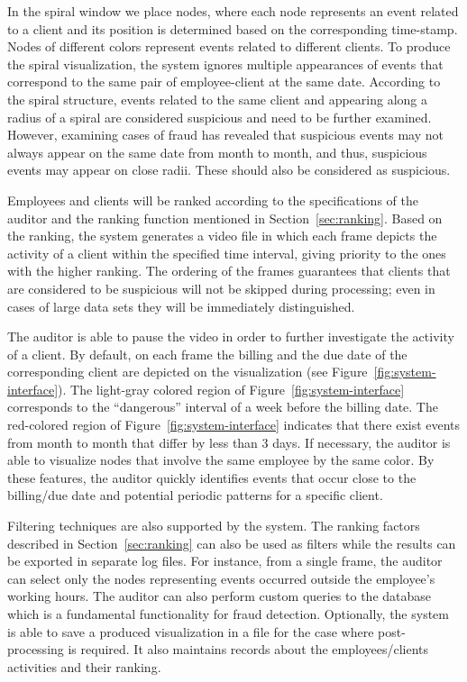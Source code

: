 \documentclass[conference]{IEEEtran}
\begin{document}
In the spiral window we place nodes, where each node represents an
event related to a client and its position is determined based on
the corresponding time-stamp. Nodes of different colors represent
events related to different clients. To produce the spiral
visualization, the system ignores multiple appearances of events
that correspond to the same pair of employee-client at the same
date. According to the spiral structure, events related to the same
client and appearing along a radius of a spiral are considered
suspicious and need to be further examined. However, examining cases
of fraud has revealed that suspicious events may not always appear
on the same date from month to month, and thus, suspicious events
may appear on close radii. These should also be considered as
suspicious.

Employees and clients will be ranked according to the specifications
of the auditor and the ranking function mentioned in
Section~\ref{sec:ranking}. Based on the ranking, the system
generates a video file in which each frame depicts the activity of a
client within the specified time interval, giving priority to the
ones with the higher ranking.  The ordering of the frames guarantees
that clients that are considered to be suspicious will not be
skipped during processing; even in cases of large data sets they
will be immediately distinguished.

The auditor is able to pause the video in order to further
investigate the activity of a client. By default, on each frame the
billing and the due date of the corresponding client are depicted on
the visualization (see Figure~\ref{fig:system-interface}). The
light-gray colored region of Figure~\ref{fig:system-interface}
corresponds to the ``dangerous'' interval of a week before the
billing date. The red-colored region of
Figure~\ref{fig:system-interface} indicates that there exist events
from month to month that differ by less than $3$ days. If necessary,
the auditor is able to visualize nodes that involve the same
employee by the same color. By these features, the auditor quickly
identifies events that occur close to the billing/due date and
potential periodic patterns for a specific client.

Filtering techniques are also supported by the system. The ranking
factors described in Section~\ref{sec:ranking} can also be used as
filters while the results can be exported in separate log files. For
instance, from a single frame, the auditor can select only the nodes
representing events occurred outside the employee's working hours.
The auditor can also perform custom queries to the database which is
a fundamental functionality for fraud detection. Optionally, the
system is able to save a produced visualization in a file for the
case where post-processing is required. It also maintains records
about the employees/clients activities and their ranking.
\end{document}
